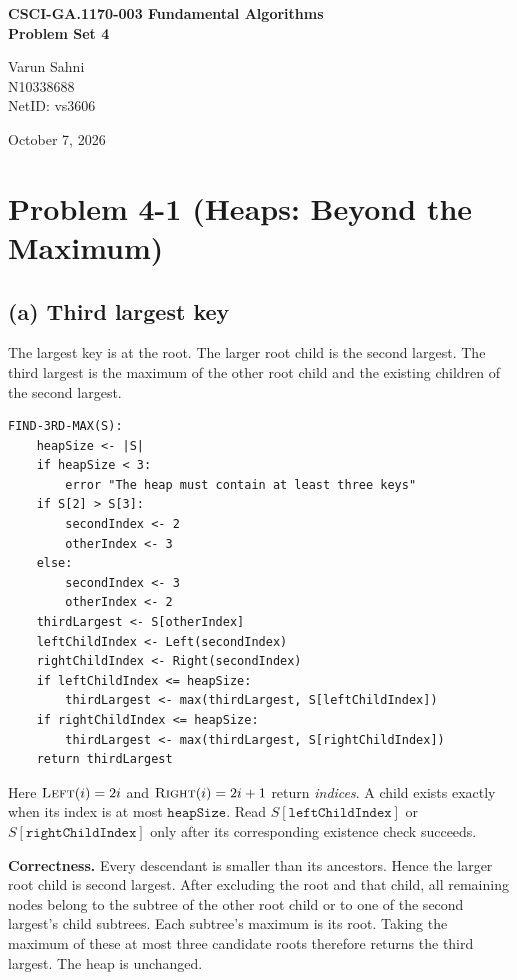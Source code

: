 \documentclass[11pt,a4paper]{article}
\newcommand{\parttitle}[1]{\Needspace{10\baselineskip}\subsection*{#1}}
\newcommand{\proc}[1]{\textsc{#1}}
\begin{document}
\begin{center}
{\Large\bfseries CSCI-GA.1170-003 Fundamental Algorithms\\[0.3em]Problem Set 4}
\end{center}
\noindent\begin{minipage}[t]{0.5\textwidth}
Varun Sahni\\N10338688\\NetID: vs3606
\end{minipage}\begin{minipage}[t]{0.5\textwidth}
\raggedleft October 7, 2026
\end{minipage}

\section*{Problem 4-1 (Heaps: Beyond the Maximum)}
\parttitle{(a) Third largest key}
The largest key is at the root. The larger root child is the second largest. The third largest is the maximum of the other root child and the existing children of the second largest.
\begin{lstlisting}
FIND-3RD-MAX(S):
    heapSize <- |S|
    if heapSize < 3:
        error "The heap must contain at least three keys"
    if S[2] > S[3]:
        secondIndex <- 2
        otherIndex <- 3
    else:
        secondIndex <- 3
        otherIndex <- 2
    thirdLargest <- S[otherIndex]
    leftChildIndex <- Left(secondIndex)
    rightChildIndex <- Right(secondIndex)
    if leftChildIndex <= heapSize:
        thirdLargest <- max(thirdLargest, S[leftChildIndex])
    if rightChildIndex <= heapSize:
        thirdLargest <- max(thirdLargest, S[rightChildIndex])
    return thirdLargest
\end{lstlisting}
Here $\proc{Left}(i)=2i$ and $\proc{Right}(i)=2i+1$ return \emph{indices}. A child exists exactly when its index is at most $\mathtt{heapSize}$. Read $S[\mathtt{leftChildIndex}]$ or $S[\mathtt{rightChildIndex}]$ only after its corresponding existence check succeeds.

\textbf{Correctness.} Every descendant is smaller than its ancestors. Hence the larger root child is second largest. After excluding the root and that child, all remaining nodes belong to the subtree of the other root child or to one of the second largest's child subtrees. Each subtree's maximum is its root. Taking the maximum of these at most three candidate roots therefore returns the third largest. The heap is unchanged.
\end{document}
